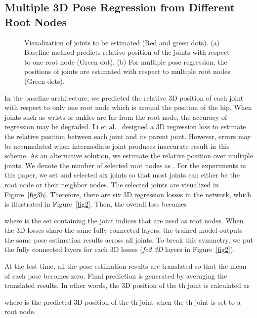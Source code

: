 \documentclass[runningheads]{llncs}
\begin{document}
\subsection{Multiple 3D Pose Regression from Different Root Nodes}
\begin{figure}[t]
\centering
  \caption{Visualization of joints to be estimated (Red and green dots). (a) Baseline method predicts relative position of the joints with respect to one root node (Green dot). (b) For multiple pose regression, the positions of joints are estimated with respect to multiple root nodes (Green dots).}
\end{figure}

In the baseline architecture, we predicted the relative 3D position of each joint with respect to only one root node which is around the position of the hip. When joints such as wrists or ankles are far from the root node, the accuracy of regression may be degraded. Li et al.~\cite{li20143d} designed a 3D regression loss to estimate the relative position between each joint and its parent joint. However, errors may be accumulated when intermediate joint produces inaccurate result in this scheme. As an alternative solution, we estimate the relative position over multiple joints. We denote the number of selected root nodes as . For the experiments in this paper, we set  and selected six joints so that most joints can either be the root node or their neighbor nodes. The selected joints are visualized in Figure~\ref{fig3b}. Therefore, there are six 3D regression losses in the network, which is illustrated in Figure~\ref{fig2}. Then, the overall loss becomes

where  is the set containing the joint indices that are used as root nodes. When the 3D losses share the same fully connected layers, the trained model outputs the same pose estimation results across all joints. To break this symmetry, we put the fully connected layers for each 3D losses (\textit{fc2 3D} layers in Figure~\ref{fig2}).

At the test time, all the pose estimation results are translated so that the mean of each pose becomes zero. Final prediction is generated by averaging the translated results. In other words, the 3D position of the th joint  is calculated as

where  is the predicted 3D position of the th joint when the th joint is set to a root node.
\end{document}
